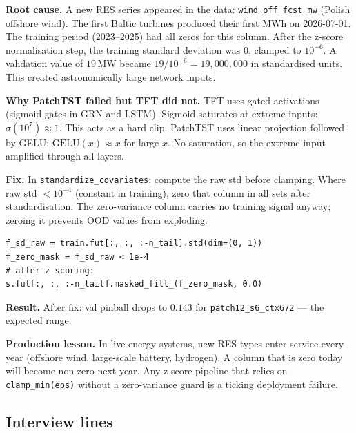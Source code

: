 \textbf{Root cause.} A new RES series appeared in the data:
\texttt{wind\_off\_fcst\_mw} (Polish offshore wind). The first Baltic turbines
produced their first MWh on 2026-07-01. The training period (2023--2025)
had all zeros for this column. After the z-score normalisation step,
the training standard deviation was $0$, clamped to $10^{-6}$. A validation
value of $19$\,MW became $19 / 10^{-6} = 19{,}000{,}000$ in standardised
units. This created astronomically large network inputs.

\textbf{Why PatchTST failed but TFT did not.} TFT uses gated activations
(sigmoid gates in GRN and LSTM). Sigmoid saturates at extreme inputs:
$\sigma(10^7) \approx 1$. This acts as a hard clip. PatchTST uses linear
projection followed by GELU: $\text{GELU}(x) \approx x$ for large $x$. No
saturation, so the extreme input amplified through all layers.

\textbf{Fix.} In \texttt{standardize\_covariates}: compute the raw std before
clamping. Where raw std $< 10^{-4}$ (constant in training), zero that column
in all sets after standardisation. The zero-variance column carries no training
signal anyway; zeroing it prevents OOD values from exploding.

\begin{verbatim}
f_sd_raw = train.fut[:, :, :-n_tail].std(dim=(0, 1))
f_zero_mask = f_sd_raw < 1e-4
# after z-scoring:
s.fut[:, :, :-n_tail].masked_fill_(f_zero_mask, 0.0)
\end{verbatim}

\textbf{Result.} After fix: val pinball drops to $0.143$ for
\texttt{patch12\_s6\_ctx672} --- the expected range.

\textbf{Production lesson.} In live energy systems, new RES types enter
service every year (offshore wind, large-scale battery, hydrogen). A column
that is zero today will become non-zero next year. Any z-score pipeline
that relies on \texttt{clamp\_min(eps)} without a zero-variance guard is a
ticking deployment failure.

\subsection{Interview lines}

